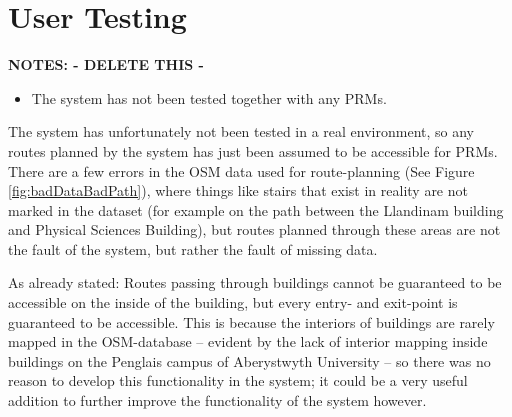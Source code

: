 \section{User Testing}
\textbf{NOTES: - DELETE THIS -}
\begin{itemize}
	\item The system has not been tested together with any PRMs.
\end{itemize}

The system has unfortunately not been tested in a real environment, so any routes planned by the system has just been assumed to be accessible for PRMs. There are a few errors in the OSM data used for route-planning (See Figure \ref{fig:badDataBadPath}), where things like stairs that exist in reality are not marked in the dataset (for example on the path between the Llandinam building and Physical Sciences Building), but routes planned through these areas are not the fault of the system, but rather the fault of missing data.

As already stated: Routes passing through buildings cannot be guaranteed to be accessible on the inside of the building, but every entry- and exit-point is guaranteed to be accessible. This is because the interiors of buildings are rarely mapped in the OSM-database -- evident by the lack of interior mapping inside buildings on the Penglais campus of Aberystwyth University -- so there was no reason to develop this functionality in the system; it could be a very useful addition to further improve the functionality of the system however.